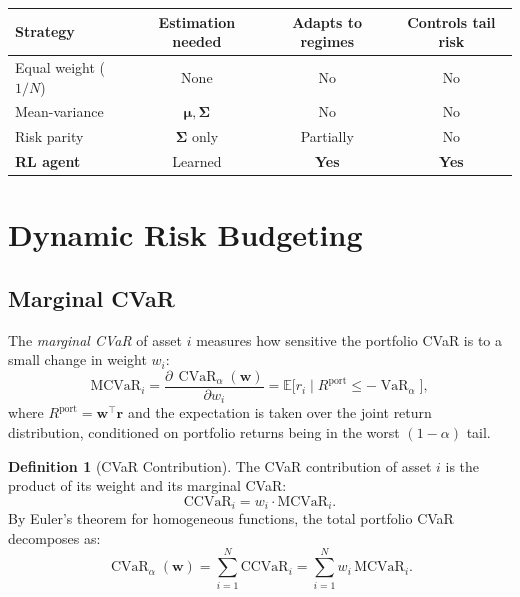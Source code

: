 \documentclass[11pt, a4paper]{article}
\theoremstyle{definition}
\newtheorem{definition}{Definition}[section]
\theoremstyle{plain}
\theoremstyle{remark}
\newcommand{\VaR}{\operatorname{VaR}}
\newcommand{\CVaR}{\operatorname{CVaR}}
\newcommand{\EV}{\mathbb{E}}
\begin{document}
\begin{center}
\begin{tabular}{lccc}
\toprule
\textbf{Strategy} & \textbf{Estimation needed}
                   & \textbf{Adapts to regimes}
                   & \textbf{Controls tail risk} \\
\midrule
Equal weight ($1/N$)  & None     & No  & No  \\
Mean-variance         & $\bm{\mu}, \bm{\Sigma}$ & No & No \\
Risk parity           & $\bm{\Sigma}$ only & Partially & No \\
\textbf{RL agent}     & Learned  & \textbf{Yes} & \textbf{Yes} \\
\bottomrule
\end{tabular}
\end{center}


\section{Dynamic Risk Budgeting}
\label{sec:dynamic_risk}

\subsection{Marginal CVaR}

The \emph{marginal CVaR} of asset $i$ measures how sensitive the
portfolio CVaR is to a small change in weight $w_i$:
\begin{equation}
    \text{MCVaR}_i
    = \frac{\partial\,\CVaR_\alpha(\bm{w})}{\partial w_i}
    = \EV\!\bigl[r_i \mid R^{\text{port}} \leq -\VaR_\alpha\bigr],
    \label{eq:mcvar}
\end{equation}
where $R^{\text{port}} = \bm{w}^\top \bm{r}$ and the expectation is
taken over the joint return distribution, conditioned on portfolio
returns being in the worst $(1-\alpha)$ tail.

\begin{definition}[CVaR Contribution]
\label{def:cvar_contribution}
The CVaR contribution of asset $i$ is the product of its weight and
its marginal CVaR:
\[
    \text{CCVaR}_i = w_i \cdot \text{MCVaR}_i.
\]
By Euler's theorem for homogeneous functions, the total portfolio CVaR
decomposes as:
\begin{equation}
    \CVaR_\alpha(\bm{w})
    = \sum_{i=1}^{N} \text{CCVaR}_i
    = \sum_{i=1}^{N} w_i\,\text{MCVaR}_i.
    \label{eq:euler_decomp}
\end{equation}
\end{definition}
\end{document}
